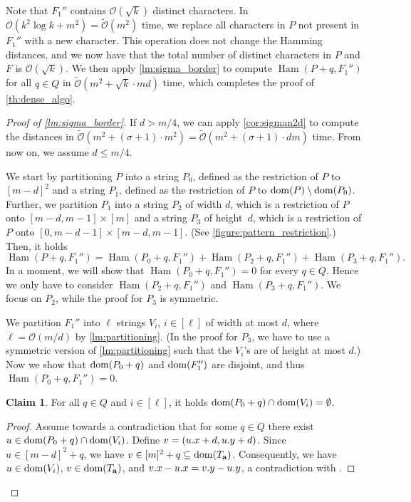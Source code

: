 \documentclass[11pt, letterpaper]{article}
\theoremstyle{plain}
\theoremstyle{definition}
\newtheorem{claim}{Claim}
\theoremstyle{remark}
\renewcommand{\O}{\mathcal{O}}
\newcommand{\tO}{\tilde{\mathcal{O}}}
\DeclareMathOperator*{\Ham}{Ham}
\begin{document}
Note that $F_1''$ contains $\O(\sqrt{k})$ distinct characters. In $\O(k^2 \log k + m^2) = \tO(m^2)$ time, we replace all characters in $P$ not present in $F_1''$ with a new character. This operation does not change the Hamming distances, and we now have that the total number of distinct characters in $P$ and $F$ is $\O(\sqrt{k})$. We then apply \cref{lm:sigma_border} to compute $\Ham(P + q, F_1'')$ for all $q \in Q$ in $\tO(m^2 + \sqrt k \cdot md)$ time, which completes the proof of \cref{th:dense_algo}. 
\begin{proof}[{Proof of \cref{lm:sigma_border}}]
If $d > m/4$, we can apply \cref{cor:sigman2d} to compute the distances in $\tO(m^2 + (\sigma+1) \cdot m^2) = \tO(m^2 + (\sigma+1) \cdot dm)$ time. From now on, we assume $d \le m / 4$. 

We start by partitioning $P$ into a string $P_0$, defined as the restriction of $P$ to $[m - d]^2$ and a string $P_1$, defined as the restriction of $P$ to $\operatorname*{dom}(P) \setminus \operatorname*{dom}(P_0)$.
Further, we partition $P_1$ into a string $P_2$ of width $d$, which is a restriction of $P$ onto $[m-d,m - 1]\times [m]$ and a string $P_3$ of height~$d$, which is a restriction of $P$ onto $[0, m-d-1] \times [m-d,m -1]$. (See \cref{figure:pattern_restriction}.) Then, it holds
%
\[ \Ham(P + q, F_1'') = \Ham(P_0 + q, F_1'') + \Ham(P_2 + q, F_1'') + \Ham(P_3 + q, F_1'').\]
%
In a moment, we will show that $\Ham(P_0 + q, F_1'') = 0$ for every $q \in Q$. Hence we only have to consider $\Ham(P_2 + q, F_1'')$ and $\Ham(P_3 + q, F_1'')$. We focus on $P_2$, while the proof for $P_3$ is symmetric.

We partition $F_1''$ into $\ell$ strings $V_i$, $i\in [\ell]$ of width at most $d$, where $\ell = \O(m/d)$ by \cref{lm:partitioning}. (In the proof for $P_3$, we have to use a symmetric version of \cref{lm:partitioning} such that the $V_i$'s are of height at most $d$.) Now we show that $\operatorname*{dom}(P_0+q)$ and $\operatorname*{dom}(F_1'')$ are disjoint, and thus $\Ham(P_0 + q, F_1'') = 0$.

\begin{claim}\label{border_hamming_reduction}
For all $q \in Q$ and $i \in [\ell]$, it holds $\operatorname*{dom}(P_0 + q) \cap \operatorname*{dom}(V_i) = \emptyset$.
\end{claim}
\begin{proof}
Assume towards a contradiction that for some $q \in Q$ there exist $u \in \operatorname*{dom}(P_0 + q) \cap \operatorname*{dom}(V_i)$. Define $v = (u.x + d, u.y + d)$. Since $u \in [m - d]^2 + q$, we have $v \in [m]^2 + q \subseteq \operatorname*{dom}(T_\mathbf{a})$. Consequently, we have $u \in \operatorname*{dom}(V_i)$, $v \in \operatorname*{dom}(T_\mathbf{a})$, and $v.x - u.x = v.y - u.y$, a contradiction with .
\end{proof}



\end{proof}
\end{document}
